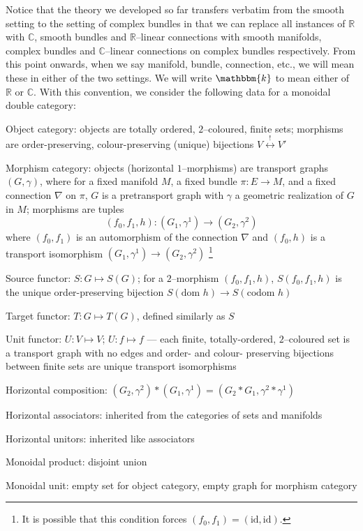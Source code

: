 \documentclass{amsart}
\newcommand{\R}{\mathbb{R}}
\newcommand{\C}{\mathbb{C}}
\newcommand{\K}{\mathbbm{k}}
\renewcommand{\to}[1][]{\stackrel{#1}{\longrightarrow}}
\renewcommand{\mapsto}{\longmapsto}
\newcommand{\codom}{\text{codom }}
\newcommand{\dom}{\text{dom }}
\newcommand{\id}{\text{id}}
\newcommand{\li}[1][]{\ifthenelse{\equal{#1}{}}{\item}{\item \label{#1}}}
\newenvironment{enmrt}{
  \enumerate[(i)]
  \setlength{\itemsep}{0pt}
}{
  \endenumerate
}
\numberwithin{thm}{section}
\theoremstyle{definition}
\begin{document}
Notice that the theory we developed so far transfers verbatim from the smooth
setting to the setting of complex bundles in that we can replace all instances
of $\R$ with $\C$, smooth bundles and $\R$--linear connections with smooth
manifolds, complex bundles and $\C$--linear connections on complex bundles
respectively. From this point onwards, when we say manifold, bundle, connection,
etc., we will mean these in either of the two settings. We will write $\K$ to
mean either of $\R$ or $\C$. With this convention, we consider the following
data for a monoidal double category:

\begin{enmrt}
\li Object category: objects are totally ordered, $2$--coloured, finite sets;
morphisms are order-preserving, colour-preserving (unique) bijections
$V \stackrel{!}{\longleftrightarrow} V'$

\li Morphism category: objects (horizontal $1$--morphisms) are transport graphs
$(G, \gamma)$, where for a fixed manifold $M$, a fixed bundle $\pi : E \to M$,
and a fixed connection $\nabla$ on $\pi$, $G$ is a pretransport graph with
$\gamma$ a geometric realization of $G$ in $M$; morphisms are tuples
\[
  (f_0, f_1, h) : (G_1, \gamma^1) \to (G_2, \gamma^2)
\]
where $(f_0, f_1)$ is an automorphism of the connection $\nabla$ and
$(f_0, h)$ is a transport isomorphism $(G_1, \gamma^1) \to (G_2, \gamma^2)$
\footnote{It is possible that this condition forces $(f_0, f_1) = (\id, \id)$.}

\li Source functor: $S : G \mapsto S(G)$; for a $2$--morphism $(f_0, f_1, h)$,
$S(f_0, f_1, h)$ is the unique order-preserving bijection
$S(\dom h) \to S(\codom h)$

\li Target functor: $T : G \mapsto T(G)$, defined similarly as $S$

\li Unit functor: $U : V \mapsto V$; $U : f \mapsto f$ --- each finite,
totally-ordered, $2$--coloured set is a transport graph with no edges and
order- and colour- preserving bijections between finite sets are unique
transport isomorphisms

\li Horizontal composition:
$(G_2, \gamma^2) * (G_1, \gamma^1) = (G_2 * G_1, \gamma^2 * \gamma^1)$

\li Horizontal associators: inherited from the categories of sets and manifolds

\li Horizontal unitors: inherited like associators

\li Monoidal product: disjoint union

\li Monoidal unit: empty set for object category, empty graph for morphism
category
\end{enmrt}
\end{document}
